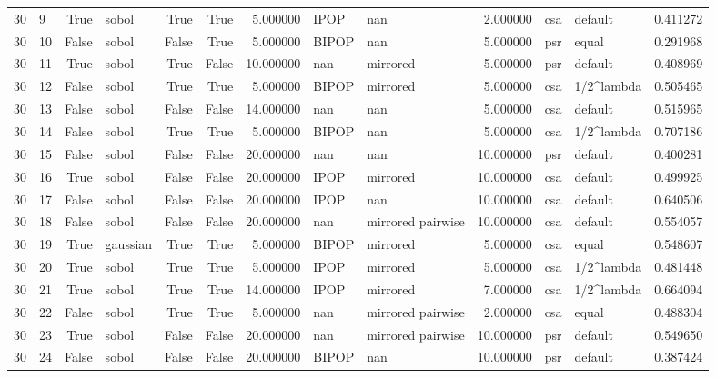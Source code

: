 \begin{tabular}{rlrlrrrllrllr}
30 & 9 & True & sobol & True & True & 5.000000 & IPOP & nan & 2.000000 & csa & default & 0.411272 \\
30 & 10 & False & sobol & False & True & 5.000000 & BIPOP & nan & 5.000000 & psr & equal & 0.291968 \\
30 & 11 & True & sobol & True & False & 10.000000 & nan & mirrored & 5.000000 & psr & default & 0.408969 \\
30 & 12 & False & sobol & True & True & 5.000000 & BIPOP & mirrored & 5.000000 & csa & 1/2^lambda & 0.505465 \\
30 & 13 & False & sobol & False & False & 14.000000 & nan & nan & 5.000000 & csa & default & 0.515965 \\
30 & 14 & False & sobol & True & True & 5.000000 & BIPOP & nan & 5.000000 & csa & 1/2^lambda & 0.707186 \\
30 & 15 & False & sobol & False & False & 20.000000 & nan & nan & 10.000000 & psr & default & 0.400281 \\
30 & 16 & True & sobol & False & False & 20.000000 & IPOP & mirrored & 10.000000 & csa & default & 0.499925 \\
30 & 17 & False & sobol & False & False & 20.000000 & IPOP & nan & 10.000000 & csa & default & 0.640506 \\
30 & 18 & False & sobol & False & False & 20.000000 & nan & mirrored pairwise & 10.000000 & csa & default & 0.554057 \\
30 & 19 & True & gaussian & True & True & 5.000000 & BIPOP & mirrored & 5.000000 & csa & equal & 0.548607 \\
30 & 20 & True & sobol & True & True & 5.000000 & IPOP & mirrored & 5.000000 & csa & 1/2^lambda & 0.481448 \\
30 & 21 & True & sobol & True & True & 14.000000 & IPOP & mirrored & 7.000000 & csa & 1/2^lambda & 0.664094 \\
30 & 22 & False & sobol & True & True & 5.000000 & nan & mirrored pairwise & 2.000000 & csa & equal & 0.488304 \\
30 & 23 & True & sobol & False & False & 20.000000 & nan & mirrored pairwise & 10.000000 & psr & default & 0.549650 \\
30 & 24 & False & sobol & False & False & 20.000000 & BIPOP & nan & 10.000000 & psr & default & 0.387424 \\
\bottomrule
\end{tabular}
